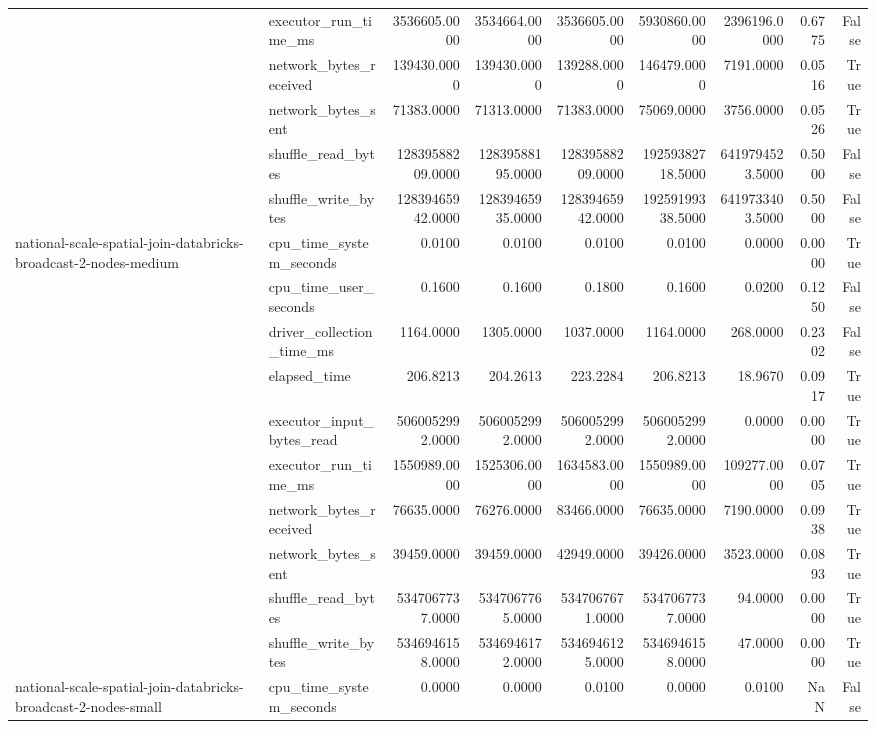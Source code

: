 \begin{tabular}{llrrrrrrr}
 & executor\_run\_time\_ms & 3536605.0000 & 3534664.0000 & 3536605.0000 & 5930860.0000 & 2396196.0000 & 0.6775 & False \\
 & network\_bytes\_received & 139430.0000 & 139430.0000 & 139288.0000 & 146479.0000 & 7191.0000 & 0.0516 & True \\
 & network\_bytes\_sent & 71383.0000 & 71313.0000 & 71383.0000 & 75069.0000 & 3756.0000 & 0.0526 & True \\
 & shuffle\_read\_bytes & 12839588209.0000 & 12839588195.0000 & 12839588209.0000 & 19259382718.5000 & 6419794523.5000 & 0.5000 & False \\
 & shuffle\_write\_bytes & 12839465942.0000 & 12839465935.0000 & 12839465942.0000 & 19259199338.5000 & 6419733403.5000 & 0.5000 & False \\
\cline{1-9}
\multirow[t]{10}{*}{national-scale-spatial-join-databricks-broadcast-2-nodes-medium} & cpu\_time\_system\_seconds & 0.0100 & 0.0100 & 0.0100 & 0.0100 & 0.0000 & 0.0000 & True \\
 & cpu\_time\_user\_seconds & 0.1600 & 0.1600 & 0.1800 & 0.1600 & 0.0200 & 0.1250 & False \\
 & driver\_collection\_time\_ms & 1164.0000 & 1305.0000 & 1037.0000 & 1164.0000 & 268.0000 & 0.2302 & False \\
 & elapsed\_time & 206.8213 & 204.2613 & 223.2284 & 206.8213 & 18.9670 & 0.0917 & True \\
 & executor\_input\_bytes\_read & 5060052992.0000 & 5060052992.0000 & 5060052992.0000 & 5060052992.0000 & 0.0000 & 0.0000 & True \\
 & executor\_run\_time\_ms & 1550989.0000 & 1525306.0000 & 1634583.0000 & 1550989.0000 & 109277.0000 & 0.0705 & True \\
 & network\_bytes\_received & 76635.0000 & 76276.0000 & 83466.0000 & 76635.0000 & 7190.0000 & 0.0938 & True \\
 & network\_bytes\_sent & 39459.0000 & 39459.0000 & 42949.0000 & 39426.0000 & 3523.0000 & 0.0893 & True \\
 & shuffle\_read\_bytes & 5347067737.0000 & 5347067765.0000 & 5347067671.0000 & 5347067737.0000 & 94.0000 & 0.0000 & True \\
 & shuffle\_write\_bytes & 5346946158.0000 & 5346946172.0000 & 5346946125.0000 & 5346946158.0000 & 47.0000 & 0.0000 & True \\
\cline{1-9}
\multirow[t]{10}{*}{national-scale-spatial-join-databricks-broadcast-2-nodes-small} & cpu\_time\_system\_seconds & 0.0000 & 0.0000 & 0.0100 & 0.0000 & 0.0100 & NaN & False \\

\end{tabular}
